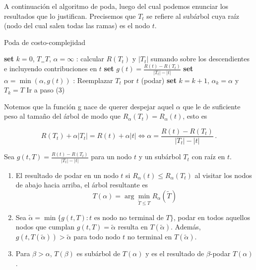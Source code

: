 A continuación el algoritmo de poda, luego del cual podemos enunciar los resultados que lo justifican. Precisemos que $T_t$ se refiere al subárbol cuya raíz (nodo del cual salen todas las ramas) es el nodo $t$.

\begin{algorithm}[H]
  \caption{Poda de costo-complejidad
    \label{alg:poda}}
  \begin{algorithmic}[1]
    \State\textbf{set} $k=0$, $T_= T$, $\alpha = \infty$
    :
        \State calcular $R(T_t)$ y $|T_t|$ sumando sobre los descendientes e incluyendo contribuciones en $t$
        \State \textbf{set} $g(t) = \frac{R(t) - R(T_t)}{|T_t| - |t|}$
        \State \textbf{set} $\alpha = \min(\alpha, g(t))$
    \EndFor
    :
            \State Reemplazar $T_t$ por $t$ (podar)
                \State \textbf{set} $k = k+1$, $\alpha_k = \alpha$ y $T_k = T$
                    \State{}
                \Else
                    \State Ir a paso (3)
                \EndIf
        \EndIf
    \EndFor
  \end{algorithmic}
\end{algorithm}

Notemos que la función g nace de querer despejar aquel $\alpha$ que le de suficiente peso al tamaño del árbol de modo que $R_\alpha (T_t) = R_\alpha(t)$, esto es

\begin{equation}
    R(T_t) + \alpha |T_t| = R(t) + \alpha |t| \Longleftrightarrow  \alpha = \frac{R(t) - R(T_t)}{|T_t| - |t|} \,.
\end{equation}

\begin{lemma}

    Sea $g(t,T) = \frac{R(t) - R(T_t)}{|T_t| - |t|}$ para un nodo $t$ y un subárbol $T_t$ con raíz en $t$.
    \begin{enumerate}
        \item El resultado de podar en un nodo $t$ si $R_\alpha(t) \leq R_\alpha(T_t)$ al visitar los nodos de abajo hacia arriba, el árbol resultante es
        \begin{equation}
            T(\alpha) = \arg\min_{\tilde T \leq T} R_\alpha(\tilde T)
        \end{equation}

        \item Sea $\tilde \alpha = \min \{ g(t,T) :t \text{ es nodo no terminal de } T \} $, podar en todos aquellos nodos que cumplan $g(t,T) = \tilde \alpha$ resulta en $T(\tilde \alpha)$. Además, $g(t, T(\tilde \alpha)) > \tilde \alpha$ para todo nodo $t$ no terminal en $T(\tilde \alpha)$.

        \item Para $\beta > \alpha$, $T(\beta)$ es subárbol de $T(\alpha)$ y es el resultado de $\beta$-podar $T(\alpha)$.
    \end{enumerate}
\end{lemma}

